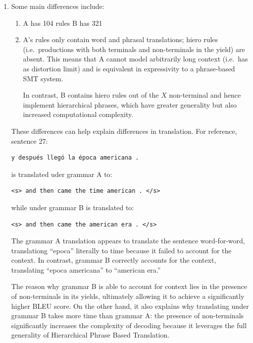\documentclass[a4paper,oneside,reqno]{amsart}
\begin{document}
\begin{enumerate}[label=\arabic*.]
  \item
    Some main differences include:
    \begin{enumerate}
      \item A has 104 rules B has 321
      \item A's rules only contain word and phrasal translations; hiero rules
        (i.e.\ productions with both terminals and non-terminals in the yield)
        are absent.  This means that A cannot model arbitrarily long context
        (i.e.\ has as distortion limit) and is equivalent in expressivity to a
        phrase-based SMT system.

        In contrast, B contains hiero rules out of the $X$ non-terminal and
        hence implement hierarchical phrases, which have greater generality
        but also increased computational complexity.
    \end{enumerate}

    These differences can help explain differences in translation. For reference,
    sentence 27:
    \begin{verbatim}
y después llegó la época americana .
    \end{verbatim}
    is translated uder grammar A to:
    \begin{verbatim}
<s> and then came the time american . </s>
    \end{verbatim}
    while under grammar B is translated to:
    \begin{verbatim}
<s> and then came the american era . </s>
    \end{verbatim}

    The grammar A translation appears to translate the sentence word-for-word,
    translationg ``epoca'' literally to time because it failed to account for
    the context. In contrast, grammar B correctly accounts for the context,
    translating ``epoca americana'' to ``american era.''

    The reason why grammar B is able to account for context lies in the presence
    of non-terminals in its yields, ultimately allowing it to achieve
    a significantly higher BLEU score. On the other hand, it also explains
    why translating under grammar B takes more time than grammar A: the presence
    of non-terminals significantly increases the complexity of decoding because
    it leverages the full generality of Hierarchical Phrase Based Translation.


\end{enumerate}
\end{document}
